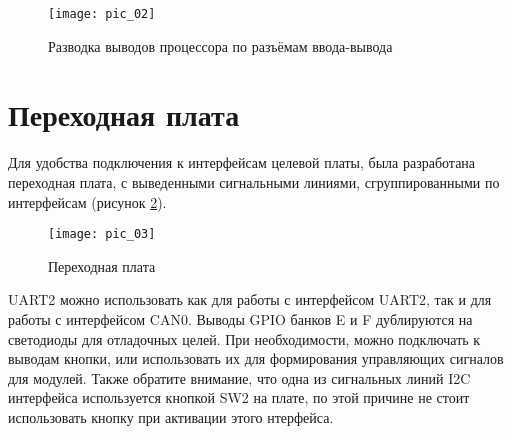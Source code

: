 \begin{center}
	\begin{figure}
		\centering\texttt{[image: pic\_02]}
		\caption{Разводка выводов процессора по разъёмам ввода-вывода}
		\label{fig:fig2}
	\end{figure}
\end{center}

\vspace{10mm}
\section*{Переходная плата}
Для удобства подключения к интерфейсам целевой платы, была разработана переходная плата, с выведенными сигнальными линиями, сгруппированными по интерфейсам (рисунок \ref{fig:fig3}).  

\begin{figure}[hbt!]
	\centering\texttt{[image: pic\_03]}
	\caption{Переходная плата}
	\label{fig:fig3}
\end{figure}

UART2 можно использовать как для работы с интерфейсом UART2, так и для работы с интерфейсом CAN0. Выводы GPIO банков E и F дублируются на светодиоды для отладочных целей. При необходимости, можно подключать к выводам кнопки, или использовать их для формирования управляющих сигналов для модулей. Также обратите внимание, что одна из сигнальных линий I2C интерфейса используется кнопкой SW2 на плате, по этой причине не стоит использовать кнопку при активации этого нтерфейса.    


